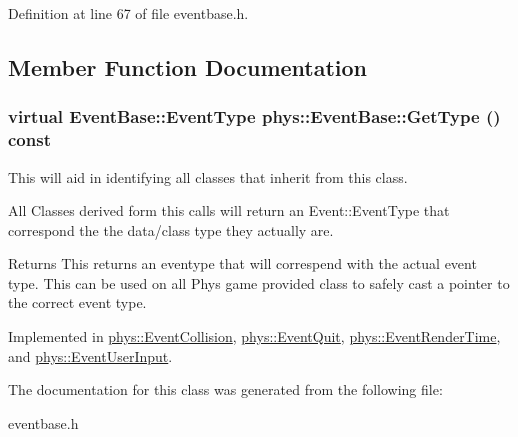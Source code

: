 Definition at line 67 of file eventbase.h.



\subsection{Member Function Documentation}
\hypertarget{classphys_1_1EventBase_a1b3d29b6ecf30f18cc3e1825a515c508}{
\subsubsection[{GetType}]{\setlength{\rightskip}{0pt plus 5cm}virtual {\bf EventBase::EventType} phys::EventBase::GetType () const}}
\label{dd/d80/classphys_1_1EventBase_a1b3d29b6ecf30f18cc3e1825a515c508}


This will aid in identifying all classes that inherit from this class. 

All Classes derived form this calls will return an Event::EventType that correspond the the data/class type they actually are. \begin{DoxyReturn}{Returns}
This returns an eventype that will correspend with the actual event type. This can be used on all Phys game provided class to safely cast a pointer to the correct event type. 
\end{DoxyReturn}


Implemented in \hyperlink{classphys_1_1EventCollision_a96c2809f1bbab78b9f2758cea15a9a36}{phys::EventCollision}, \hyperlink{classphys_1_1EventQuit_a3bfca875349e73dbda47c3c62a253e3b}{phys::EventQuit}, \hyperlink{classphys_1_1EventRenderTime_a160ca55bf9e5a2ae80dab82eab88baf5}{phys::EventRenderTime}, and \hyperlink{classphys_1_1EventUserInput_a3e803a8d9bcc1576fe04d2245a86ec80}{phys::EventUserInput}.



The documentation for this class was generated from the following file:\begin{DoxyCompactItemize}
\item 
eventbase.h\end{DoxyCompactItemize}
